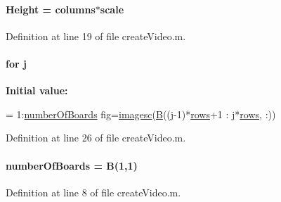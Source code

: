 \hypertarget{a00099_ab734dfc6b1d672d82e0a028d0a6fe4c2}{}
\paragraph[{Height}]{ Height = {\bf columns}$\ast$scale}\label{a00099_ab734dfc6b1d672d82e0a028d0a6fe4c2}


Definition at line 19 of file create\+Video.\+m.

\hypertarget{a00099_ac86694252f8dfdb19aaeadc4b7c342c6}{}
\paragraph[{j}]{\setlength{\rightskip}{0pt plus 5cm}for j}\label{a00099_ac86694252f8dfdb19aaeadc4b7c342c6}
{\bfseries Initial value\+:}
\begin{DoxyCode}
= 1:\hyperlink{a00099_a6093167544fa2acb408ee7af13b715c0}{numberOfBoards}
    fig=\hyperlink{a00099_ab0e1a129bba9d8649f7f060184ceaa1e}{imagesc}(\hyperlink{a00099_a9d3d9048db16a7eee539e93e3618cbe7}{B}((\hyperlink{a00099_ac86694252f8dfdb19aaeadc4b7c342c6}{j}-1)*\hyperlink{a00099_ab56a9d9a5877fa9746152fae2c6a74dc}{rows}+1 : \hyperlink{a00099_ac86694252f8dfdb19aaeadc4b7c342c6}{j}*\hyperlink{a00099_ab56a9d9a5877fa9746152fae2c6a74dc}{rows}, :))
\end{DoxyCode}


Definition at line 26 of file create\+Video.\+m.

\hypertarget{a00099_a6093167544fa2acb408ee7af13b715c0}{}
\paragraph[{number\+Of\+Boards}]{\setlength{\rightskip}{0pt plus 5cm}number\+Of\+Boards = {\bf B}(1,1)}\label{a00099_a6093167544fa2acb408ee7af13b715c0}


Definition at line 8 of file create\+Video.\+m.

\hypertarget{a00099_a90c346df14c7ec8c77240e20732f2ac1}{}
